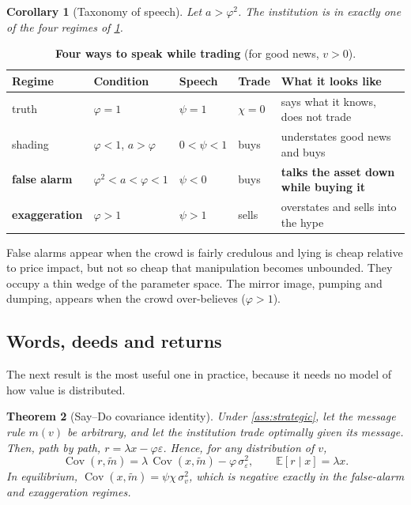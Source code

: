 \documentclass[11pt,a4paper]{article}
\theoremstyle{sci}
\newtheorem{theorem}{Theorem}[section]
\newtheorem{corollary}[theorem]{Corollary}
\theoremstyle{scidef}
\newcommand{\E}{\mathbb{E}}
\DeclareMathOperator{\Cov}{Cov}
\begin{document}
\begin{corollary}[Taxonomy of speech]\label{cor:taxonomy}
Let $a>\varphi^2$. The institution is in exactly one of the four regimes of \cref{tab:taxonomy}.
\end{corollary}

\begin{table}[h]
\centering
\caption{\textbf{Four ways to speak while trading} (for good news, $v>0$).}
\label{tab:taxonomy}
\small
\begin{tabularx}{0.95\linewidth}{@{}l>{\raggedright}p{3.2cm}ll>{\raggedright\arraybackslash}X@{}}
\toprule
\textsf{Regime} & \textsf{Condition} & \textsf{Speech} & \textsf{Trade} & \textsf{What it looks like} \\
\midrule
truth & $\varphi=1$ & $\psi=1$ & $\chi=0$ & says what it knows, does not trade \\
shading & $\varphi<1$, $a>\varphi$ & $0<\psi<1$ & buys & understates good news and buys \\
\textcolor{echo}{\textbf{false alarm}} & $\varphi^2<a<\varphi<1$ & $\psi<0$ & buys & \textbf{talks the asset down while buying it} \\
\textcolor{sMagenta}{\textbf{exaggeration}} & $\varphi>1$ & $\psi>1$ & sells & overstates and sells into the hype \\
\bottomrule
\end{tabularx}
\end{table}

\begin{inwords}
False alarms appear when the crowd is fairly credulous and lying is cheap relative to price impact, but not so cheap that manipulation becomes unbounded. They occupy a thin wedge of the parameter space. The mirror image, pumping and dumping, appears when the crowd over-believes ($\varphi>1$).
\end{inwords}

\subsection{Words, deeds and returns}

The next result is the most useful one in practice, because it needs no model of how value is distributed.

\begin{theorem}[Say--Do covariance identity]\label{thm:identity}
Under \cref{ass:strategic}, let the message rule $m(v)$ be \emph{arbitrary}, and let the institution trade optimally given its message. Then, path by path, $r=\lambda x-\varphi\varepsilon$. Hence, for any distribution of $v$,
\[
  \Cov(r,\tilde m)=\lambda\,\Cov(x,\tilde m)-\varphi\,\sigma_\varepsilon^2,\qquad \E[r\mid x]=\lambda x .
\]
In equilibrium, $\Cov(x,\tilde m)=\psi\chi\,\sigma_v^2$, which is negative exactly in the false-alarm and exaggeration regimes.
\end{theorem}
\end{document}
